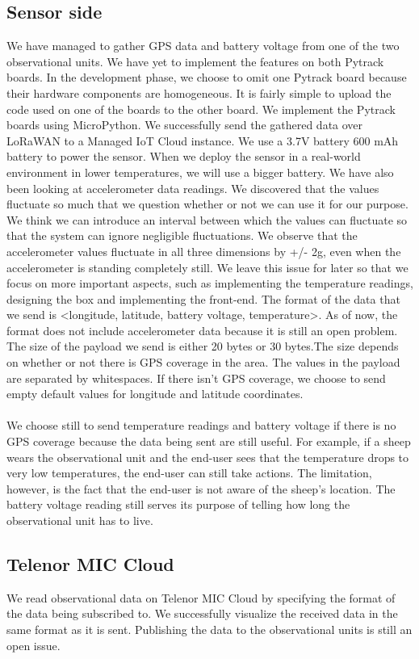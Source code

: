 	\subsection{Sensor side}
		We have managed to gather GPS data and battery voltage from one of the two observational units. We have yet to implement the features on both Pytrack boards. In the development phase, we choose to omit one Pytrack board because their hardware components are homogeneous. It is fairly simple to upload the code used on one of the boards to the other board. We implement the Pytrack boards using MicroPython. We successfully send the gathered data over LoRaWAN to a Managed IoT Cloud instance. We use a 3.7V battery 600 mAh battery to power the sensor. When we deploy the sensor in a real-world environment in lower temperatures, we will use a bigger battery. We have also been looking at accelerometer data readings. We discovered that the values fluctuate so much that we question whether or not we can use it for our purpose. We think we can introduce an interval between which the values can fluctuate so that the system can ignore negligible fluctuations. We observe that the accelerometer values fluctuate in all three dimensions by +/- 2g, even when the accelerometer is standing completely still. We leave this issue for later so that we focus on more important aspects, such as implementing the temperature readings, designing the box and implementing the front-end. The format of the data that we send is <longitude, latitude, battery voltage, temperature>. As of now, the format does not include accelerometer data because it is still an open problem. The size of the payload we send is either 20 bytes or 30 bytes.The size depends on whether or not there is GPS coverage in the area. The values in the payload are separated by whitespaces. If there isn’t GPS coverage, we choose to send empty default values for longitude and latitude coordinates.
		\\\\
		We choose still to send temperature readings and battery voltage if there is no GPS coverage because the data being sent are still useful. For example, if a sheep wears the observational unit and the end-user sees that the temperature drops to very low temperatures, the end-user can still take actions. The limitation, however, is the fact that the end-user is not aware of the sheep’s location. The battery voltage reading still serves its purpose of telling how long the observational unit has to live.  
		
	\subsection{Telenor MIC Cloud}
		We read observational data on Telenor MIC Cloud by specifying the format of the data being subscribed to. We successfully visualize the received data in the same format as it is sent. Publishing the data to the observational units is still an open issue.
	 
